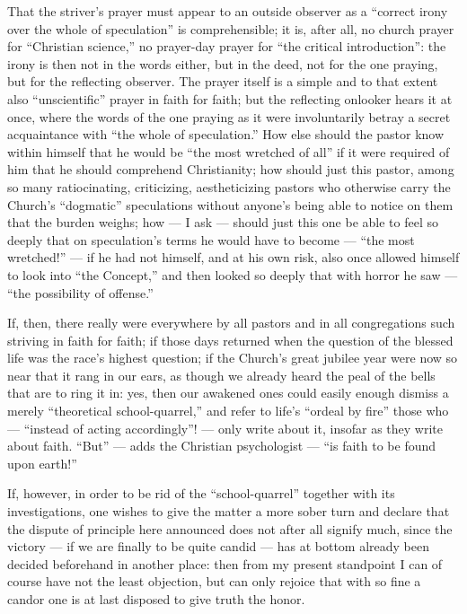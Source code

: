 \documentclass[12pt,a4paper]{book}
\begin{document}
That the striver's prayer must appear to an outside observer as a ``correct
irony over the whole of speculation'' is comprehensible; it is, after all, no
church prayer for ``Christian science,'' no prayer-day prayer for ``the
critical introduction'': the irony is then not in the words either, but in the
deed, not for the one praying, but for the reflecting observer. The prayer
itself is a simple and to that extent also ``unscientific'' prayer in faith for
faith; but the
reflecting onlooker hears it at once, where the words of the one praying as it
were involuntarily betray a secret acquaintance with ``the whole of
speculation.'' How else should the pastor know within himself that he would be
``the most wretched of all'' if it were required of him that he should
comprehend Christianity; how should just this pastor, among so many
ratiocinating, criticizing, aestheticizing pastors who otherwise carry the
Church's ``dogmatic'' speculations without anyone's being able to notice on
them that the burden weighs; how --- I ask --- should just this one be able to
feel so deeply that on speculation's terms he would have to become --- ``the
most wretched!'' --- if he had not himself, and at his own risk, also once
allowed himself to look into ``the Concept,'' and then looked so deeply that
with horror he saw --- ``the possibility of offense.''

If, then, there really were everywhere by all pastors and in all congregations
such striving in faith for faith; if those days returned when the question of
the blessed life was the race's highest question; if the Church's great jubilee
year were now so near that it rang in our ears, as though we already heard the
peal of the bells that are to ring it in: yes, then our awakened ones could
easily enough dismiss a merely ``theoretical school-quarrel,'' and refer to
life's ``ordeal by fire'' those who --- ``instead of acting accordingly''! ---
only write about it, insofar as they write about faith. ``But'' --- adds the
Christian psychologist --- ``is faith to be found upon earth!''

If, however, in order to be rid of the ``school-quarrel'' together with its
investigations, one wishes to give the matter a more sober turn and declare
that the dispute of principle here announced does not after all signify much,
since the victory --- if we are finally to be quite candid --- has at bottom
already been decided beforehand in another place: then from my present
standpoint I can of course have not the least objection, but can only rejoice
that with so fine a candor one is at last disposed to give truth the honor.
\end{document}
